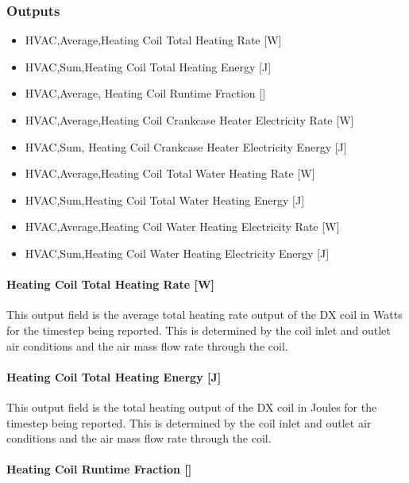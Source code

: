\subsubsection{Outputs}\label{outputs-24}

\begin{itemize}
\item
  HVAC,Average,Heating Coil Total Heating Rate {[}W{]}
\item
  HVAC,Sum,Heating Coil Total Heating Energy {[}J{]}
\item
  HVAC,Average, Heating Coil Runtime Fraction {[]}
\item
  HVAC,Average,Heating Coil Crankcase Heater Electricity Rate {[}W{]}
\item
  HVAC,Sum, Heating Coil Crankcase Heater Electricity Energy {[}J{]}
\item
  HVAC,Average,Heating Coil Total Water Heating Rate {[}W{]}
\item
  HVAC,Sum,Heating Coil Total Water Heating Energy {[}J{]}
\item
  HVAC,Average,Heating Coil Water Heating Electricity Rate {[}W{]}
\item
  HVAC,Sum,Heating Coil Water Heating Electricity Energy {[}J{]}
\end{itemize}

\paragraph{Heating Coil Total Heating Rate {[}W{]}}\label{heating-coil-total-heating-rate-w-7}

This output field is the average total heating rate output of the DX coil in Watts for the timestep being reported. This is determined by the coil inlet and outlet air conditions and the air mass flow rate through the coil.

\paragraph{Heating Coil Total Heating Energy {[}J{]}}\label{heating-coil-total-heating-energy-j-7}

This output field is the total heating output of the DX coil in Joules for the timestep being reported. This is determined by the coil inlet and outlet air conditions and the air mass flow rate through the coil.

\paragraph{Heating Coil Runtime Fraction {[]}}\label{heating-coil-runtime-fraction-5}

